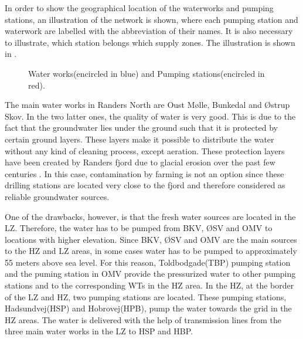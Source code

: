 In order to show the geographical location of the waterworks and pumping stations, an illustration of the network is shown, where each pumping station and waterwork are labelled with the abbreviation of their names. It is also necessary to illustrate, which station belongs which supply zones. The illustration is shown in .

\vspace{-5mm}

\begin{figure}[H]
\centering
 
\caption{Water works(encircled in blue) and Pumping stations(encircled in red).}
\vspace{-3mm}
\label{fig:pumping_stations_and_waterworks}
\end{figure}

The main water works in Randers North are Oust Mølle, Bunkedal and Østrup Skov. In the two latter ones, the quality of water is very good. This is due to the fact that the groundwater lies under the ground such that it is protected by certain ground layers. These layers make it possible to distribute the water without any kind of cleaning process, except aeration. These protection layers have been created by Randers fjord due to glacial erosion over the past few centuries \cite{geological1909water}. In this case, contamination by farming is not an option since these drilling stations are located very close to the fjord and therefore considered as reliable groundwater sources. 

One of the drawbacks, however, is that the fresh water sources are located in the LZ. Therefore, the water has to be pumped from BKV, ØSV and OMV to locations with higher elevation. Since BKV, ØSV and OMV are the main sources to the HZ and LZ areas, in some cases water has to be pumped to approximately 55 meters above sea level. For this reason, Toldbodgade(TBP) pumping station and the puming station in OMV provide the pressurized water to other pumping stations and to the corresponding WTs in the HZ area. In the HZ, at the border of the LZ and HZ, two pumping stations are located. These pumping stations, Hadsundvej(HSP) and Hobrovej(HPB), pump the water towards the grid in the HZ areas. The water is delivered with the help of transmission lines from the three main water works in the LZ to HSP and HBP. 

